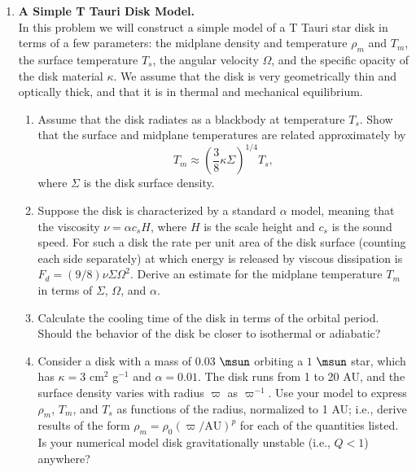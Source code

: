 \documentclass[twoside]{tufte-book} %
\begin{document}
\begin{enumerate}
\item {\bf A Simple T Tauri Disk Model.}\\
In this problem we will construct a simple model of a T Tauri star disk in terms of a few parameters: the midplane density and temperature $\rho_m$ and $T_m$, the surface temperature $T_s$, the angular velocity $\Omega$, and the specific opacity of the disk material $\kappa$. We assume that the disk is very geometrically thin and optically thick, and that it is in thermal and mechanical equilibrium.
\begin{enumerate}
\item Assume that the disk radiates as a blackbody at temperature $T_s$. Show that the surface and midplane temperatures are related approximately by
\begin{displaymath}
T_m \approx \left(\frac{3}{8}\kappa\Sigma\right)^{1/4} T_s,
\end{displaymath}
where $\Sigma$ is the disk surface density.
\item Suppose the disk is characterized by a standard $\alpha$ model, meaning that the viscosity $\nu=\alpha c_s H$, where $H$ is the scale height and $c_s$ is the sound speed. For such a disk the rate per unit area of the disk surface (counting each side separately) at which energy is released by viscous dissipation is $F_d=(9/8) \nu \Sigma \Omega^2$. Derive an estimate for the midplane temperature $T_m$ in terms of $\Sigma$, $\Omega$, and $\alpha$.
\item Calculate the cooling time of the disk in terms of the orbital period. Should the behavior of the disk be closer to isothermal or adiabatic?
\item Consider a disk with a mass of $0.03$ $\msun$ orbiting a $1$ $\msun$ star, which has $\kappa=3$ cm$^2$ g$^{-1}$ and $\alpha=0.01$. The disk runs from 1 to 20 AU, and the surface density varies with radius $\varpi$ as $\varpi^{-1}$. Use your model to express $\rho_m$, $T_m$, and $T_s$ as functions of the radius, normalized to 1 AU; i.e., derive results of the form $\rho_m = \rho_0 (\varpi/\mathrm{AU})^p$ for each of the quantities listed. Is your numerical model disk gravitationally unstable (i.e., $Q<1$) anywhere?
\end{enumerate}



\end{enumerate}
\end{document}
